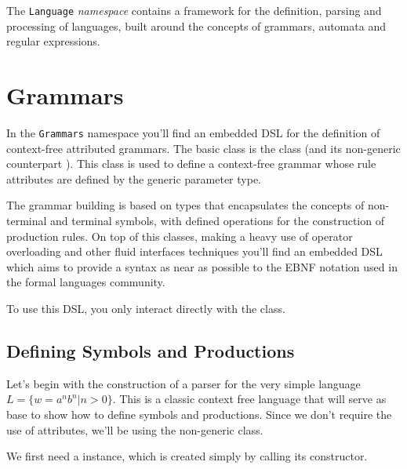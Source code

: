 The \texttt{Language} \emph{namespace} contains a framework
for the definition, parsing and processing of languages,
built around the concepts of grammars, automata and regular expressions.

\section{Grammars}

In the \texttt{Grammars} namespace you'll find an embedded DSL for
the definition of context-free attributed grammars. The basic class
is the  
class (and its non-generic counterpart ).
This class is used to define a context-free grammar whose rule attributes
are defined by the generic parameter type.  

The grammar building is based on types that encapsulates the concepts
of non-terminal and terminal symbols, with defined operations for
the construction of production rules. On top of this classes, making
a heavy use of operator overloading and other fluid interfaces techniques
you'll find an embedded DSL which aims to provide a syntax as near as
possible to the EBNF notation used in the formal languages community.

To use this DSL, you only interact directly with the 
 class.

\subsection{Defining Symbols and Productions}

Let's begin with the construction of a parser for the very simple language
$L = \{ w = a^n b^n | n > 0 \}$. This is a classic context free language 
that will serve as base to show how to define symbols and productions.
Since we don't require the use of attributes, we'll be using the non-generic
 class.

We first need a  instance,
which is created simply by calling its constructor.

